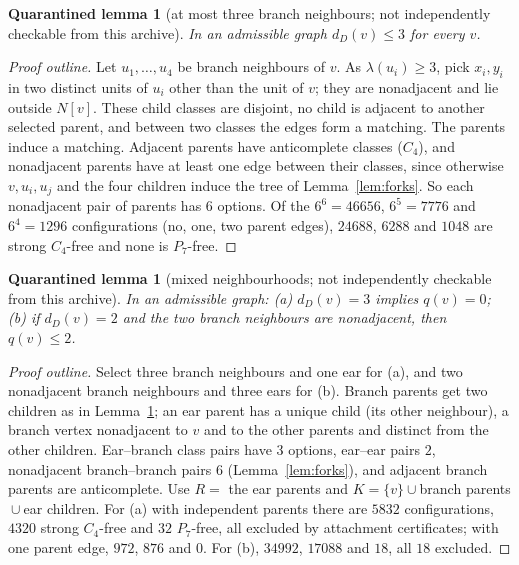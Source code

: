 \documentclass[11pt]{amsart}
\newtheorem{qlemma}[theorem]{Quarantined lemma}
\theoremstyle{definition}
\theoremstyle{remark}
\begin{document}
\begin{qlemma}[at most three branch neighbours; not independently checkable from this archive]\label{lem:branch}
In an admissible graph $d_D(v)\le3$ for every $v$.
\end{qlemma}

\begin{proof}[Proof outline]
Let $u_1,\dots,u_4$ be branch neighbours of $v$. As $\lambda(u_i)\ge3$, pick $x_i,y_i$ in two distinct units of $u_i$ other than the unit of $v$; they are nonadjacent and lie outside $N[v]$. These child classes are disjoint, no child is adjacent to another selected parent, and between two classes the edges form a matching. The parents induce a matching. Adjacent parents have anticomplete classes ($C_4$), and nonadjacent parents have at least one edge between their classes, since otherwise $v,u_i,u_j$ and the four children induce the tree of Lemma~\ref{lem:forks}. So each nonadjacent pair of parents has $6$ options. Of the $6^6=46656$, $6^5=7776$ and $6^4=1296$ configurations (no, one, two parent edges), $24688$, $6288$ and $1048$ are strong $C_4$-free and none is $P_7$-free.
\end{proof}

\begin{qlemma}[mixed neighbourhoods; not independently checkable from this archive]\label{lem:mixed}
In an admissible graph: \textup{(a)} $d_D(v)=3$ implies $q(v)=0$; \textup{(b)} if $d_D(v)=2$ and the two branch neighbours are nonadjacent, then $q(v)\le2$.
\end{qlemma}

\begin{proof}[Proof outline]
Select three branch neighbours and one ear for (a), and two nonadjacent branch neighbours and three ears for (b). Branch parents get two children as in Lemma~\ref{lem:branch}; an ear parent has a unique child (its other neighbour), a branch vertex nonadjacent to $v$ and to the other parents and distinct from the other children. Ear--branch class pairs have $3$ options, ear--ear pairs $2$, nonadjacent branch--branch pairs $6$ (Lemma~\ref{lem:forks}), and adjacent branch parents are anticomplete. Use $R=$ the ear parents and $K=\{v\}\cup{}$branch parents${}\cup{}$ear children. For (a) with independent parents there are $5832$ configurations, $4320$ strong $C_4$-free and $32$ $P_7$-free, all excluded by attachment certificates; with one parent edge, $972$, $876$ and $0$. For (b), $34992$, $17088$ and $18$, all $18$ excluded.
\end{proof}
\end{document}
